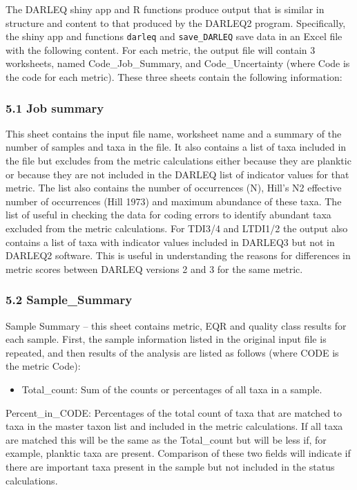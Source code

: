 \documentclass[
]{article}
\providecommand{\tightlist}{%
  \setlength{\itemsep}{0pt}\setlength{\parskip}{0pt}}
\begin{document}
The DARLEQ shiny app and R functions produce output that is similar in
structure and content to that produced by the DARLEQ2 program.
Specifically, the shiny app and functions \texttt{darleq} and
\texttt{save\_DARLEQ} save data in an Excel file with the following
content. For each metric, the output file will contain 3 worksheets,
named Code\_Job\_Summary, and Code\_Uncertainty (where Code is the code
for each metric). These three sheets contain the following information:

\hypertarget{job-summary}{%
\subsubsection{5.1 Job summary}\label{job-summary}}

This sheet contains the input file name, worksheet name and a summary of
the number of samples and taxa in the file. It also contains a list of
taxa included in the file but excludes from the metric calculations
either because they are planktic or because they are not included in the
DARLEQ list of indicator values for that metric. The list also contains
the number of occurrences (N), Hill's N2 effective number of occurrences
(Hill 1973) and maximum abundance of these taxa. The list of useful in
checking the data for coding errors to identify abundant taxa excluded
from the metric calculations. For TDI3/4 and LTDI1/2 the output also
contains a list of taxa with indicator values included in DARLEQ3 but
not in DARLEQ2 software. This is useful in understanding the reasons for
differences in metric scores between DARLEQ versions 2 and 3 for the
same metric.

\hypertarget{sample_summary}{%
\subsubsection{5.2 Sample\_Summary}\label{sample_summary}}

Sample Summary -- this sheet contains metric, EQR and quality class
results for each sample. First, the sample information listed in the
original input file is repeated, and then results of the analysis are
listed as follows (where CODE is the metric Code):

\begin{itemize}
\tightlist
\item
  Total\_count: Sum of the counts or percentages of all taxa in a
  sample.
\end{itemize}

Percent\_in\_CODE: Percentages of the total count of taxa that are
matched to taxa in the master taxon list and included in the metric
calculations. If all taxa are matched this will be the same as the
Total\_count but will be less if, for example, planktic taxa are
present. Comparison of these two fields will indicate if there are
important taxa present in the sample but not included in the status
calculations.
\end{document}
